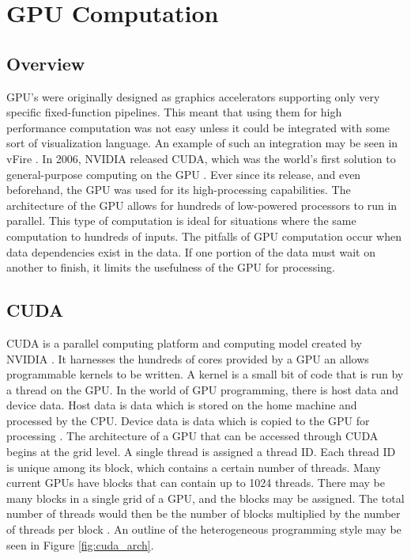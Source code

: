 \section{GPU Computation}
\subsection{Overview}
GPU's were originally designed as graphics accelerators supporting only very specific fixed-function pipelines. This meant that using them for high performance computation was not easy unless it could be integrated with some sort of visualization language. An example of such an integration may be seen in vFire \cite{vFire}. In 2006, NVIDIA released CUDA, which was the world's first solution to general-purpose computing on the GPU \cite{cuda}. Ever since its release, and even beforehand, the GPU was used for its high-processing capabilities. The architecture of the GPU allows for hundreds of low-powered processors to run in parallel. This type of computation is ideal for situations where the same computation to hundreds of inputs. The pitfalls of GPU computation occur when data dependencies exist in the data. If one portion of the data must wait on another to finish, it limits the usefulness of the GPU for processing. 

\subsection{CUDA}
CUDA is a parallel computing platform and computing model created by NVIDIA \cite{cuda}. It harnesses the hundreds of cores provided by a GPU an allows programmable kernels to be written. A kernel is a small bit of code that is run by a thread on the GPU. In the world of GPU programming, there is host data and device data. Host data is data which is stored on the home machine and processed by the CPU. Device data is data which is copied to the GPU for processing \cite{cudabyexample}. The architecture of a GPU that can be accessed through CUDA begins at the grid level. A single thread is assigned a thread ID. Each thread ID is unique among its block, which contains a certain number of threads. Many current GPUs have blocks that can contain up to 1024 threads. There may be many blocks in a single grid of a GPU, and the blocks may be assigned. The total number of threads would then be the number of blocks multiplied by the number of threads per block \cite{cuda}. An outline of the heterogeneous programming style may be seen in Figure \ref{fig:cuda_arch}. 

